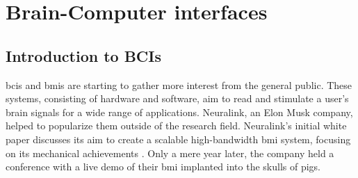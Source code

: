 




\glsresetall

\chapter{Brain-Computer interfaces}
\label{ch:bci}


\section{Introduction to BCIs}
\label{sec:bci_introduction}

\Glspl{bci} and \glspl{bmi} are starting to gather more interest from the general public.
These systems, consisting of hardware and software, aim to read and stimulate a user's brain signals for a wide range of applications.
Neuralink, an Elon Musk company, helped to popularize them outside of the research field.
Neuralink's initial white paper discusses its aim to create a scalable high-bandwidth \gls{bmi} system, focusing on its mechanical achievements \citep{neuralink_whitepaper}.
Only a mere year later, the company held a conference with a live demo of their \gls{bmi} implanted into the skulls of pigs.

